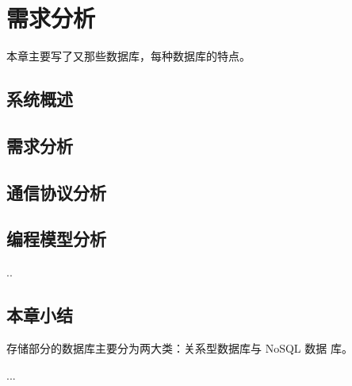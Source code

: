 
\chapter{需求分析}
本章主要写了又那些数据库，每种数据库的特点。
\section{系统概述}
\section{需求分析}
\section{通信协议分析}
\section{编程模型分析}
..
\section{本章小结}
存储部分的数据库主要分为两大类：关系型数据库与 NoSQL 数据
库。

...